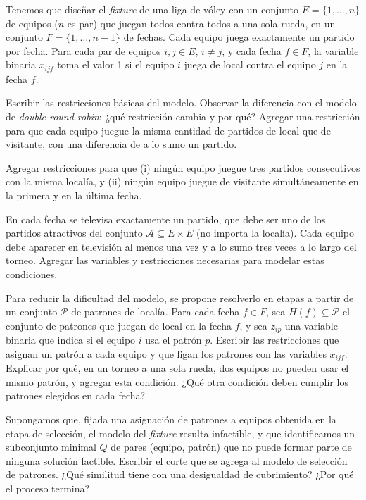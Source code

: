 \documentclass[11pt,a4paper]{article}
\begin{document}
\newpage
Tenemos que diseñar el \emph{fixture} de una liga de vóley con un conjunto
$E = \{1,\dots,n\}$ de equipos ($n$ es par) que juegan todos contra todos a una
sola rueda, en un conjunto $F = \{1,\dots,n-1\}$ de fechas. Cada equipo juega
exactamente un partido por fecha. Para cada par de equipos $i,j \in E$,
$i \ne j$, y cada fecha $f \in F$, la variable binaria $x_{ijf}$ toma el valor 1
si el equipo $i$ juega de local contra el equipo $j$ en la fecha $f$.

\begin{puntos}
  \item Escribir las restricciones básicas del modelo. Observar la diferencia
  con el modelo de \emph{double round-robin}: ¿qué restricción cambia y por qué?
  Agregar una restricción para que cada equipo juegue la misma cantidad de
  partidos de local que de visitante, con una diferencia de a lo sumo un
  partido.

  \item Agregar restricciones para que (i) ningún equipo juegue tres partidos
  consecutivos con la misma localía, y (ii) ningún equipo juegue de visitante
  simultáneamente en la primera y en la última fecha.

  \item En cada fecha se televisa exactamente un partido, que debe ser uno de los
  partidos atractivos del conjunto $\mathcal{A} \subseteq E \times E$ (no importa
  la localía). Cada equipo debe aparecer en televisión al menos una vez y a lo
  sumo tres veces a lo largo del torneo. Agregar las variables y restricciones
  necesarias para modelar estas condiciones.

  \item Para reducir la dificultad del modelo, se propone resolverlo en etapas a
  partir de un conjunto $\mathcal{P}$ de patrones de localía. Para cada fecha
  $f \in F$, sea $H(f) \subseteq \mathcal{P}$ el conjunto de patrones que juegan
  de local en la fecha $f$, y sea $z_{ip}$ una variable binaria que indica si el
  equipo $i$ usa el patrón $p$. Escribir las restricciones que asignan un patrón
  a cada equipo y que ligan los patrones con las variables $x_{ijf}$. Explicar
  por qué, en un torneo a una sola rueda, dos equipos no pueden usar el mismo
  patrón, y agregar esta condición. ¿Qué otra condición deben cumplir los
  patrones elegidos en cada fecha?

  \item Supongamos que, fijada una asignación de patrones a equipos obtenida en
  la etapa de selección, el modelo del \emph{fixture} resulta infactible, y que
  identificamos un subconjunto minimal $Q$ de pares (equipo, patrón) que no puede
  formar parte de ninguna solución factible. Escribir el corte que se agrega al
  modelo de selección de patrones. ¿Qué similitud tiene con una desigualdad de
  cubrimiento? ¿Por qué el proceso termina?
\end{puntos}
\end{document}
